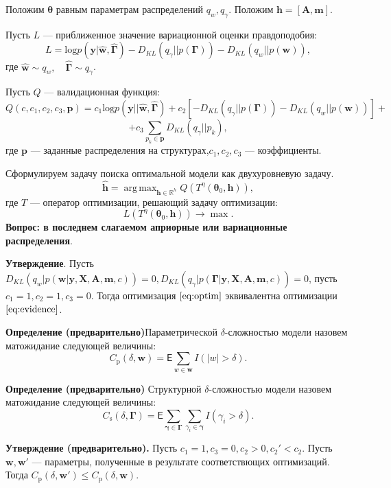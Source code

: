\documentclass[12pt]{article}
\DeclareMathOperator*{\argmax}{arg\,max}
\begin{document}
Положим $\boldsymbol{\theta}$ равным параметрам распределений $q_w, q_\gamma$. 
Положим $\mathbf{h} = [\mathbf{A}, \mathbf{m}].$

Пусть $L$ --- приближенное значение вариационной оценки правдоподобия:
\[
    L = \text{log} p(\mathbf{y}|\hat{\mathbf{w}}, \hat{\boldsymbol{\Gamma}}) - {D_{KL}}(q_\gamma||p(\boldsymbol{\Gamma})) - {D_{KL}}(q_{w}||p(\mathbf{w})),
\]
где $\hat{\mathbf{w}} \sim q_w, \quad \hat{\boldsymbol{\Gamma}} \sim q_\gamma$.

Пусть $Q$ --- валидационная функция:
\[
    Q(c, c_1, c_2, c_3, \mathbf{p}) = c_1\text{log} p(\mathbf{y}||\hat{\mathbf{w}}, \hat{\boldsymbol{\Gamma}}) + c_2[-{D_{KL}}(q_\gamma||p(\boldsymbol{\Gamma})) - {D_{KL}}(q_{w}||p(\mathbf{w}))] + 
\]
\[
    + c_3\sum_{p_k \in \mathbf{p}}{D_{KL}}(q_\gamma||p_k),
\]
где $\mathbf{p}$ --- заданные распределения на структурах,$c_1,c_2,c_3$ --- коэффициенты.

Сформулируем задачу поиска оптимальной модели как двухуровневую задачу.
\begin{equation}
\label{eq:optim}
	\hat{\mathbf{h}} = \argmax_{\mathbf{h} \in \mathbb{R}^h} Q( T^\eta(\boldsymbol{\theta}_0, \mathbf{h})),
\end{equation}
где $T$ --- оператор оптимизации, решающий задачу оптимизации:
\[
    L(T^\eta(\boldsymbol{\theta}_0, \mathbf{h})) \to \max.
\]
\textbf{Вопрос: в последнем слагаемом априорные или вариационные распределения}.


\textbf{Утверждение}. Пусть $D_{KL}(q_w|p(\mathbf{w}|\mathbf{y}, \mathbf{X}, \mathbf{A},\mathbf{m}, c)) = 0, D_{KL}(q_\gamma|p(\boldsymbol{\Gamma}|\mathbf{y}, \mathbf{X}, \mathbf{A},\mathbf{m}, c)) = 0$, пусть $c_1 = 1, c_2 = 1, c_3 = 0$. Тогда оптимизация $\eqref{eq:optim}$ эквивалентна оптимизации $\eqref{eq:evidence}$.

\textbf{Определение (предварительно)}Параметрической $\delta$-сложностью модели назовем матожидание следующей величины:
\[
    C_\text{p}(\delta, \mathbf{w}) = \mathsf{E}\sum_{w \in \mathbf{w}} I(|w| > \delta).
\] 

\textbf{Определение (предварительно)} Структурной $\delta$-сложностью модели назовем матожидание следующей величины:
\[
     C_\text{s}(\delta, \boldsymbol{\Gamma}) = \mathsf{E}\sum_{\boldsymbol{\gamma} \in \boldsymbol{\Gamma}}\sum_{\gamma_i \in \boldsymbol{\gamma}} I(\gamma_i > \delta). 
\]


\textbf{Утверждение (предварительно).} Пусть $c_1 = 1, c_3 = 0, c_2 > 0, c_2' < c_2$. Пусть $\mathbf{w}, \mathbf{w}'$ --- параметры, полученные в результате соответствющих оптимизаций. Тогда  $C_\text{p}(\delta, \mathbf{w}') \leq C_\text{p}(\delta, \mathbf{w}).$ 
\end{document}
